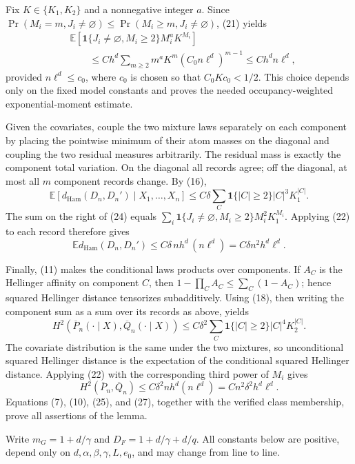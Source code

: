 Fix \(K\in\{K_1,K_2\}\) and a nonnegative integer \(a\).  Since \(\Pr(M_i=m,J_i\ne\varnothing)\le\Pr(M_i\ge m,J_i\ne\varnothing)\), (21) yields
\[
\begin{split}
 &\mathbb E\!\left[
 \mathbf 1\{J_i\ne\varnothing,M_i\ge2\}M_i^aK^{M_i}
 \right]\\
 &\qquad\le Ch^d\sum_{m\ge2}m^aK^m(C_0n\ell^d)^{m-1}
 \le Ch^d n\ell^d,
\end{split}
 \tag{22}
\]
provided \(n\ell^d\le c_0\), where \(c_0\) is chosen so that \(C_0Kc_0<1/2\).  This choice depends only on the fixed model constants and proves the needed occupancy-weighted exponential-moment estimate.

Given the covariates, couple the two mixture laws separately on each component by placing the pointwise minimum of their atom masses on the diagonal and coupling the two residual measures arbitrarily.  The residual mass is exactly the component total variation.  On the diagonal all records agree; off the diagonal, at most all \(m\) component records change.  By (16),
\[
 \mathbb E[d_{\mathrm{Ham}}(D_n,D_n')\mid X_1,\ldots,X_n]
 \le C\delta\sum_C\mathbf 1\{|C|\ge2\}|C|^3K_1^{|C|}.
 \tag{24}
\]
The sum on the right of (24) equals
\(\sum_i\mathbf 1\{J_i\ne\varnothing,M_i\ge2\}M_i^2K_1^{M_i}\).  Applying (22) to each record therefore gives
\[
 \mathbb E d_{\mathrm{Ham}}(D_n,D_n')
 \le C\delta\,n h^d\,(n\ell^d)
 =C\delta n^2h^d\ell^d.
 \tag{25}
\]

Finally, (11) makes the conditional laws products over components.  If \(A_C\) is the Hellinger affinity on component \(C\), then
\(1-\prod_CA_C\le\sum_C(1-A_C)\); hence squared Hellinger distance tensorizes subadditively.  Using (18), then writing the component sum as a sum over its records as above, yields
\[
 H^2(\overline P_n(\cdot\mid X),\overline Q_n(\cdot\mid X))
 \le C\delta^2\sum_C\mathbf 1\{|C|\ge2\}|C|^4K_2^{|C|}.
 \tag{26}
\]
The covariate distribution is the same under the two mixtures, so unconditional squared Hellinger distance is the expectation of the conditional squared Hellinger distance.  Applying (22) with the corresponding third power of \(M_i\) gives
\[
 H^2(\overline P_n,\overline Q_n)
 \le C\delta^2 n h^d(n\ell^d)
 =C n^2\delta^2h^d\ell^d.
 \tag{27}
\]
Equations (7), (10), (25), and (27), together with the verified class membership, prove all assertions of the lemma.

Write \(m_G=1+d/\gamma\) and \(D_F=1+d/\gamma+d/q\).  All constants below are positive, depend only on \(d,\alpha,\beta,\gamma,L,e_0\), and may change from line to line.

